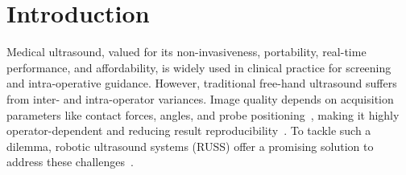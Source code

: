  \section{Introduction}
Medical ultrasound, valued for its non-invasiveness, portability, real-time performance, and affordability, is widely used in clinical practice for screening and intra-operative guidance. However, traditional free-hand ultrasound suffers from inter- and intra-operator variances. Image quality depends on acquisition parameters like contact forces, angles, and probe positioning~\cite{tan2023autonomous,huang2018robotic}, making it highly operator-dependent and reducing result reproducibility~\cite{tan2022flexible}. To tackle such a dilemma, robotic ultrasound systems (RUSS) offer a promising solution to address these challenges~\cite{jiang2023robotic, akbari2021robot,bi2024machine}.

